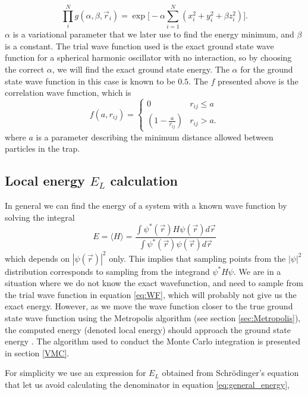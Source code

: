\documentclass[norsk,a4paper,12pt]{article}
\begin{document}
\begin{equation}
\prod_i^Ng(\alpha, \beta, \vec{r}_i)=\exp\Big[-\alpha\sum_{i=1}^N(x_i^2+y_i^2+\beta z_i^2)\Big].
\end{equation}
$\alpha$ is a variational parameter that we later use to find the energy minimum, and $\beta$ is a constant. The trial wave function used is the exact ground state wave function for a spherical harmonic oscillator with no interaction, so by choosing the correct $\alpha$, we will find the exact ground state energy. The $\alpha$ for the ground state wave function in this case is known to be $0.5$. The $f$ presented above is the correlation wave function, which is 
\begin{equation}
\label{eq:WF_interaction_part}
f(a,r_{ij})=
\begin{cases} 
   0 & r_{ij} \leq a \\
   \left(1-\frac{a}{r_{ij}}\right) & r_{ij} > a.
\end{cases}
\end{equation}
where $a$ is a parameter describing the minimum distance allowed between particles in the trap.

\subsection{Local energy $E_L$ calculation}
In general we can find the energy of a system with a known wave function by solving the integral
\begin{equation}
E=\langle H\rangle = \frac{\int\psi^*(\vec{r})H\psi(\vec{r})d\vec{r}}{\int\psi^*(\vec{r})\psi(\vec{r})d\vec{r}}
\label{eq:general_energy}
\end{equation}
which depends on $|\psi(\vec{r})|^2$ only. This implies that sampling points from the $|\psi|^2$ distribution corresponds to sampling from the integrand $\psi^*H\psi$. We are in a situation where we do not know the exact wavefunction, and need to sample from the trial wave function in equation \ref{eq:WF}, which will probably not give us the exact energy. However, as we move the wave function closer to the true ground state wave function using the Metropolis algorithm (see section \ref{sec:Metropolis}), the computed energy (denoted local energy) should approach the ground state energy \cite{JKNilsen}. The algorithm used to conduct the Monte Carlo integration is presented in section \ref{VMC}.

For simplicity we use an expression for $E_L$ obtained from Schr\"{o}dinger's equation that let us avoid calculating the denominator in equation \ref{eq:general_energy},
\end{document}
